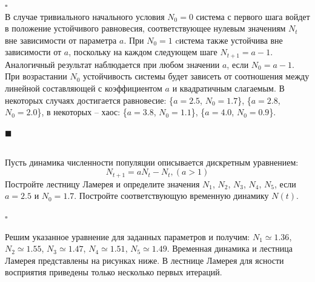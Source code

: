 \documentclass[a4paper]{article}
\newcommand{\solutionstart}{{\noindent $\square$ \\}}
\newcommand{\solutionend}{{\noindent $\blacksquare$ \\}}
\begin{document}
\solutionstart
В случае тривиального начального условия $N_0 = 0$ система с первого шага войдет в положение устойчивого равновесия, соответствующее нулевым значениям $N_t$ вне зависимости от параметра $a$. При $N_0 = 1$ cистема также устойчива вне зависимости от $a$, поскольку на каждом следующем шаге $N_{t + 1} = a - 1$. Аналогичный результат наблюдается при любом значении $a$, если $N_0 = a - 1$. При возрастании $N_0$ устойчивость системы будет зависеть от соотношения между линейной составляющей с коэффициентом $a$ и квадратичным слагаемым. В некоторых случаях достигается равновесие: \{$a = 2.5$, $N_0 = 1.7$\}, \{$a = 2.8$, $N_0 = 2.0$\}, в некоторых -- хаос: \{$a = 3.8$, $N_0 = 1.1$\}, \{$a = 4.0$, $N_0 = 0.9$\}.

\solutionend



\subsection{}
Пусть динамика численности популяции описывается дискретным уравнением:
\[
N_{t + 1} = a N_t - N_t, (a > 1)
\]
Постройте лестницу Ламерея и определите значения $N_1$, $N_2$, $N_3$, $N_4$, $N_5$, если $a = 2.5$ и $N_0 = 1.7$. Постройте соответствующую временную динамику $N(t)$.

\solutionstart

Решим указанное уравнение для заданных параметров и получим: $N_1 \simeq 1.36$, $N_2 \simeq 1.55$, $N_3 \simeq 1.47$, $N_4 \simeq 1.51$, $N_5 \simeq 1.49$. Временная динамика и лестница Ламерея представлены на рисунках ниже. В лестнице Ламерея для ясности восприятия приведены только несколько первых итераций.
\end{document}
